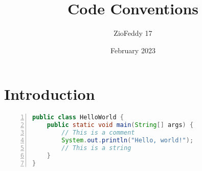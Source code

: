 \documentclass{article}
\title{Code Conventions}
\author{ZioFeddy 17}
\date{February 2023}
\begin{document}
\maketitle

\section{Introduction}
\begin{lstlisting}[language=Java, numbers=left]
public class HelloWorld {
    public static void main(String[] args) {
        // This is a comment
        System.out.println("Hello, world!"); 
        // This is a string
    }
}
\end{lstlisting}
\end{document}
